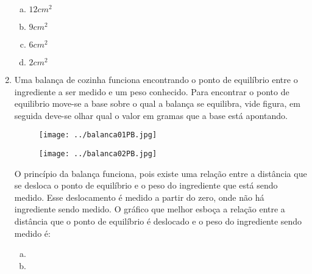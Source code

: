 \documentclass[a4paper,11pt,oneside,brazilian]{article}
\begin{document}
\begin{enumerate}[{R}1]
  \begin{enumerate}[a)]
    \item $12 cm^2$
    \item $9 cm^2$
    \item $6 cm^2$
    \item $2 cm^2$
  \end{enumerate}

  \item Uma balança de cozinha funciona encontrando o ponto de equilíbrio entre
  o ingrediente a ser medido e um peso conhecido. Para encontrar o ponto de
  equilibrio move-se a base sobre o qual a balança se equilibra, vide figura,
  em seguida deve-se olhar qual o valor em gramas que a base está apontando. 
  
  \begin{multicols}{2}
  
	\begin{figure}[H]
		 \centering
		 \texttt{[image: ../balanca01PB.jpg]}
		 \label{fig:bal01}
	\end{figure}
  \nopagebreak[4]
	

	\begin{figure}[H]
		 \centering
		 \texttt{[image: ../balanca02PB.jpg]}
		 \label{fig:bal02}
	\end{figure}
  \end{multicols}
  
  O princípio da balança funciona, pois existe uma relação entre a distância que
  se desloca o ponto de equilíbrio e o peso do ingrediente que está sendo
  medido. Esse deslocamento é medido a partir do zero, onde não há ingrediente
  sendo medido. O gráfico que melhor esboça a relação entre a distância que o
  ponto de equilíbrio é deslocado e o peso do ingrediente sendo medido é:
  
  \begin{enumerate}[a)]
    \item 
    \item 



\end{enumerate}
\end{enumerate}
\end{document}
